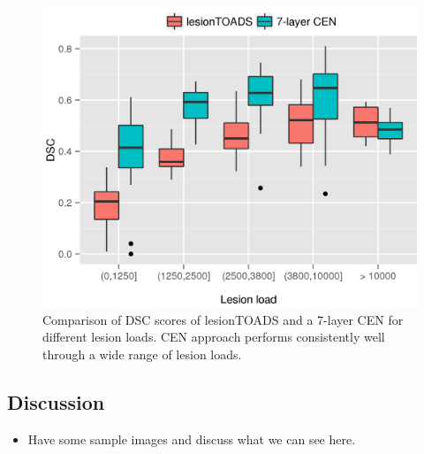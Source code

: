 \begin{figure}[tb]
\centering
\includegraphics[width=\columnwidth]{figures/boxplot_LL}
\caption{Comparison of DSC scores of lesionTOADS and a 7-layer CEN for different
lesion loads. CEN approach performs consistently well through a wide range of
lesion loads.}
\end{figure}

\subsection{Discussion}

\begin{itemize}
\item Have some sample images and discuss what we can see here.
\end{itemize}

